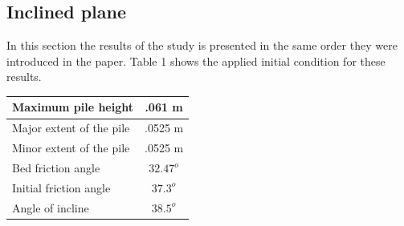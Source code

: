 \documentclass[letterpaper,10pt]{article}
\begin{document}
\subsection{Inclined plane}
In this section the results of the study is presented in the same order they were introduced in the paper.
Table 1 shows the applied initial condition for these results.
\begin{center}
	\begin{tabular}{|l|c|}
		\hline
		Maximum pile height       & .061 m \\
		\hline
		Major extent of the pile  & .0525 m \\
		\hline
		Minor extent of the pile  & .0525 m \\
		\hline           
		Bed friction angle        & $32.47^o$ \\
		\hline
		Initial friction angle    & $37.3^o$ \\
		\hline
		Angle of incline          & $38.5^o$ \\
		\hline
	\end{tabular}
\end{center}
\end{document}
